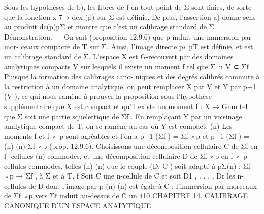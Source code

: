 \documentclass[
  10pt,
]{article}
\newenvironment{Shaded}{}{}
\newcommand{\NormalTok}[1]{#1}
\begin{document}
\begin{Shaded}
\begin{Highlighting}[]
\NormalTok{   Sous les hypothèses de b), les fibres de f en tout point de Σ sont finies, de sorte que}
\NormalTok{la fonction x 7→ dcx (p) sur Σ est définie. De plus, l’assertion a) donne sens au produit}
\NormalTok{dc(p)µΣ et montre que c’est un calibrage standard de Σ.}
\NormalTok{Démonstration. — On sait (proposition 12.9.6) que p induit une immersion par mor{-}}
\NormalTok{ceaux compacte de T sur Σ. Ainsi, l’image directe p∗ µT est définie, et est un calibrage}
\NormalTok{standard de Σ.}
\NormalTok{   L’espace X est G{-}recouvert par des domaines analytiques compacts V sur lesquels}
\NormalTok{il existe un moment f tel que Σ ∩ V ⊂ Σf . Puisque la formation des calibrages cano{-}}
\NormalTok{niques et des degrés calibrés commute à la restriction à un domaine analytique, on peut}
\NormalTok{remplacer X par V et Y par p−1 (V ), ce qui nous ramène à prouver la proposition sous}
\NormalTok{l’hypothèse supplémentaire que X est compact et qu’il existe un moment f : X → Gnm tel}
\NormalTok{que Σ soit une partie squelettique de Σf . En remplaçant Y par un voisinage analytique}
\NormalTok{compact de T, on se ramène au cas où Y est compact.}
\NormalTok{                                                                                    (n)}
\NormalTok{   Les moments f et f ◦ p sont agréables et l’on a p−1 (Σf ) = Σf ◦p et p−1 (Σf ) =}
\NormalTok{ (n)                                                                        (n)}
\NormalTok{Σf ◦p (prop. 12.9.6). Choisissons une décomposition cellulaire C de Σf            en f {-}cellules}
\NormalTok{                                                     (n)}
\NormalTok{commodes, et une décomposition cellulaire D de Σf ◦p en f ◦ p{-}cellules commodes, telles}
\NormalTok{                                             (n)     (n)}
\NormalTok{que le couple (D, C ) soit adapté à pΣ(n) : Σf ◦p → Σf , à Σ et à T.}
\NormalTok{                                        f}
\NormalTok{  Soit C une n{-}cellule de C et soit D1 , . . . , Dr les n{-}cellules de D dont l’image par p}
\NormalTok{                                                   (n)        (n)}
\NormalTok{est égale à C ; l’immersion par morceaux de Σf ◦p vers Σf induit au{-}dessus de C̊ un}
\NormalTok{410          CHAPITRE 14. CALIBRAGE CANONIQUE D’UN ESPACE ANALYTIQUE}


\end{Highlighting}
\end{Shaded}
\end{document}
